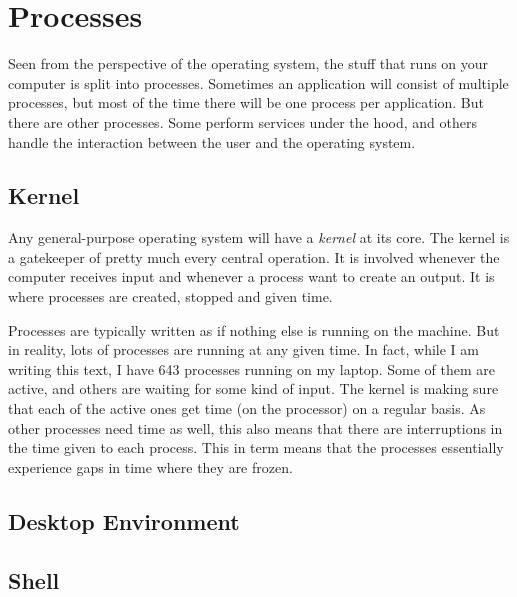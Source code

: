 \section{Processes}

Seen from the perspective of the operating system, the stuff that runs on your computer is split into processes. Sometimes an application will consist of multiple processes, but most of the time there will be one process per application. But there are other processes. Some perform services under the hood, and others handle the interaction between the user and the operating system.

\subsection{Kernel}

Any general-purpose operating system will have a \textsl{kernel} at its core. The kernel is a gatekeeper of pretty much every central operation. It is involved whenever the computer receives input and whenever a process want to create an output. It is where processes are created, stopped and given time.

Processes are typically written as if nothing else is running on the machine. But in reality, lots of processes are running at any given time. In fact, while I am writing this text, I have 643 processes running on my laptop. Some of them are active, and others are waiting for some kind of input. The kernel is making sure that each of the active ones get time (on the processor) on a regular basis. As other processes need time as well, this also means that there are interruptions in the time given to each process. This in term means that the processes essentially experience gaps in time where they are frozen.

\subsection{Desktop Environment}



\subsection{Shell}

